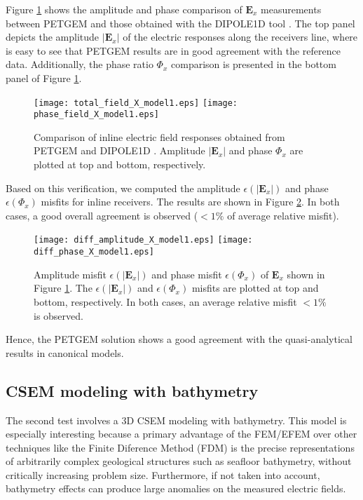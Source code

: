 \documentclass[review]{elsarticle}
\begin{document}
Figure \ref{fig:fields_X_model1} shows the amplitude and phase comparison of $\mathbf{E}_{x}$ measurements between PETGEM and those obtained with the DIPOLE1D tool \citep{Key2009}. The top panel depicts the amplitude 
$|\mathbf{E}_{x}|$ of the electric responses along the receivers line, where is easy to see that PETGEM results are in good agreement with the reference data. Additionally, the phase ratio $\Phi_{x}$ comparison is presented in the bottom panel of Figure \ref{fig:fields_X_model1}. 
\begin{figure}[!htbp]
	\centering
	\texttt{[image: total\_field\_X\_model1.eps]}
	\texttt{[image: phase\_field\_X\_model1.eps]}
	\caption{Comparison of inline electric field responses obtained from PETGEM and DIPOLE1D \citep{Key2009}. Amplitude $|\mathbf{E}_{x}|$ and phase $\Phi_{x}$ are plotted at top and bottom, respectively.}
	\label{fig:fields_X_model1}
\end{figure}
Based on this verification, we computed the amplitude $\epsilon(|\mathbf{E}_{x}|)$ and phase $\epsilon(\Phi_{x})$ misfits for inline receivers. The results are shown in Figure \ref{fig:diff_X_model1}. In both cases, a good overall agreement is observed ($<1\%$ of average relative misfit).
\begin{figure}[!htbp]
	\centering
	\texttt{[image: diff\_amplitude\_X\_model1.eps]}
	\texttt{[image: diff\_phase\_X\_model1.eps]}
	\caption{Amplitude misfit $\epsilon(|\mathbf{E}_{x}|)$ and phase misfit $\epsilon(\Phi_{x})$ of $\mathbf{E}_{x}$  shown in Figure \ref{fig:fields_X_model1}. The $\epsilon(|\mathbf{E}_{x}|)$ and $\epsilon(\Phi_{x})$ misfits are plotted at top and bottom, respectively. In both cases, an average relative misfit $<1\%$ is observed.}
	\label{fig:diff_X_model1}
\end{figure}
Hence, the PETGEM solution shows a good agreement with the quasi-analytical results in canonical models.

\subsection{CSEM modeling with bathymetry}
\label{Bathymetry_test}
The second test involves a 3D CSEM modeling with bathymetry. This model is especially interesting because a primary advantage of the FEM/EFEM over other techniques like the Finite Diference Method (FDM) is the precise representations of arbitrarily complex geological structures such as seafloor bathymetry, without critically increasing problem size. Furthermore, if not taken into account, bathymetry effects can produce large anomalies on the measured electric fields.
\end{document}
